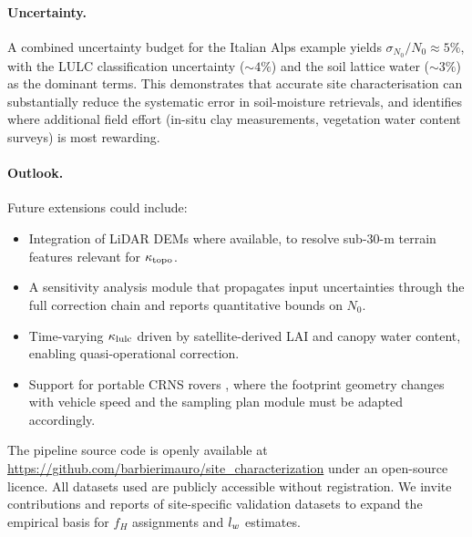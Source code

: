 \paragraph{Uncertainty.}
A combined uncertainty budget for the Italian Alps example yields
$\sigma_{N_0}/N_0 \approx 5\%$, with the LULC classification
uncertainty ($\sim 4\%$) and the soil lattice water ($\sim 3\%$)
as the dominant terms.
This demonstrates that accurate site characterisation can
substantially reduce the systematic error in soil-moisture
retrievals, and identifies where additional field effort (in-situ
clay measurements, vegetation water content surveys) is most
rewarding.

\paragraph{Outlook.}
Future extensions could include:
\begin{itemize}[nosep]
  \item Integration of LiDAR DEMs where available, to resolve
        sub-30-m terrain features relevant for $\kappa_\mathrm{topo}$.
  \item A sensitivity analysis module that propagates input
        uncertainties through the full correction chain and reports
        quantitative bounds on $N_0$.
  \item Time-varying $\kappa_\mathrm{lulc}$ driven by satellite-derived LAI and
        canopy water content, enabling quasi-operational correction.
  \item Support for portable CRNS rovers \citep{schron2017}, where
        the footprint geometry changes with vehicle speed and the
        sampling plan module must be adapted accordingly.
\end{itemize}

The pipeline source code is openly available at
\url{https://github.com/barbierimauro/site_characterization}
under an open-source licence.
All datasets used are publicly accessible without registration.
We invite contributions and reports of site-specific validation
datasets to expand the empirical basis for $f_H$ assignments and
$l_w$ estimates.
